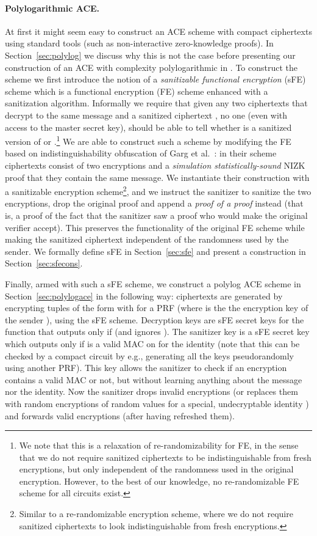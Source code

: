 \documentclass{llncs}
\begin{document}
\paragraph{Polylogarithmic ACE.} At first it might seem easy to construct an ACE scheme with compact ciphertexts using standard tools (such as non-interactive zero-knowledge proofs). In Section~\ref{sec:polylog} we discuss why this is not the case before presenting our construction of an ACE with complexity polylogarithmic in . To construct the scheme we first introduce the notion of a \emph{sanitizable functional encryption} (sFE) scheme which is a functional encryption (FE) scheme enhanced with a sanitization algorithm. Informally we require that given any two ciphertexts  that decrypt to the same message and a sanitized ciphertext , no one (even with access to the master secret key), should be able to tell whether  is a sanitized version of  or .\footnote{We note that this is a relaxation of re-randomizability for FE, in the sense that we do not require sanitized ciphertexts to be indistinguishable from fresh encryptions, but only independent of the randomness used in the original encryption. However, to the best of our knowledge, no re-randomizable FE scheme for all circuits exist.} We are able to construct such a scheme by modifying the FE based on indistinguishability obfuscation of Garg et al.~\cite{DBLP:conf/focs/GargGH0SW13}: in their scheme ciphertexts consist of two encryptions and a \emph{simulation statistically-sound} NIZK proof that they contain the same message. We instantiate their construction with a sanitizable encryption scheme\footnote{Similar to a re-randomizable encryption scheme, where we do not require sanitized ciphertexts to look indistinguishable from fresh encryptions.}, and we instruct the sanitizer to sanitize the two encryptions, drop the original proof and append a \emph{proof of a proof} instead (that is, a proof of the fact that the sanitizer saw a proof who would make the original verifier accept). This preserves the functionality of the original FE scheme while making the sanitized ciphertext independent of the randomness used by the sender. 
We formally define sFE in Section~\ref{sec:sfe} and present a construction in Section~\ref{sec:sfecons}.

Finally, armed with such a sFE scheme, we construct a polylog ACE scheme in Section~\ref{sec:polylogace} in the following way: ciphertexts are generated by encrypting tuples of the form  with  for a PRF  (where  is the the encryption key of the sender ), using the sFE scheme. Decryption keys are sFE secret keys for the function that outputs  only if  (and ignores ). The sanitizer key is a sFE secret key which outputs  only if  is a valid MAC on  for the identity  (note that this can be checked by a compact circuit by e.g., generating all the keys  pseudorandomly using another PRF). This key allows the sanitizer to check if an encryption contains a valid MAC or not, but without learning anything about the message nor the identity. Now the sanitizer drops invalid encryptions (or replaces them with random encryptions of random values for a special, undecryptable identity ) and forwards valid encryptions (after having refreshed them). 
\end{document}
